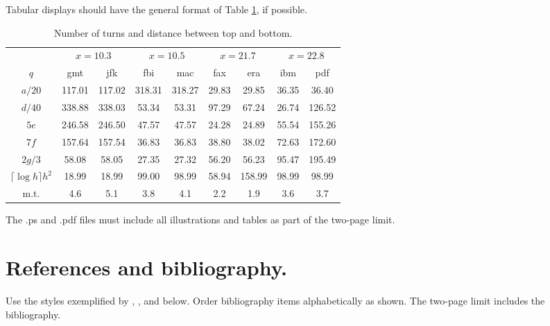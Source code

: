 \documentclass[twoside]{article}
\begin{document}
Tabular displays should have the general format of Table \ref{turns}, if
possible.  

\begin{table}[h]
\begin{center} {\footnotesize
\begin{tabular}{|c|cc|cc|cc|cc|}
\hline
 & \multicolumn{2}{c|}{$x=10.3$} & \multicolumn{2}{c|}{$x=10.5$} &
\multicolumn{2}{c|}{$x=21.7$} & \multicolumn{2}{c|}{$x=22.8$} \\
$q$  & \multicolumn{1}{c}{gmt} & \multicolumn{1}{c|}{jfk} &
\multicolumn{1}{c}{fbi} & \multicolumn{1}{c|}{mac} & \multicolumn{1}{c}{fax} &
\multicolumn{1}{c|}{era} & \multicolumn{1}{c}{ibm} &
\multicolumn{1}{c|}{pdf}\\\hline
$a/20$ &     117.01 & 117.02  &   318.31 & 318.27  &   29.83 & 29.85    & 36.35 
& 36.40 \\
$d/40$  &     338.88 & 338.03  &   53.34 & 53.31  &  97.29 & 67.24 &   26.74 &
126.52 \\
$5e$ &     246.58 & 246.50  &   47.57 & 47.57  &  24.28 & 24.89 &   55.54 &
155.26 \\
$7f$    &     157.64 & 157.54  &   36.83 & 36.83  &  38.80 & 38.02 &   72.63 &
172.60 \\
$2g/3$   &     58.08 & 58.05  &   27.35 & 27.32  &  56.20 & 56.23 &   95.47 &
195.49 \\
$\lceil \log h \rceil h^2$    &     18.99 & 18.99  &   99.00 & 98.99  &  58.94 &
158.99 &   98.99 & 98.99 \\
\hline m.t. &     4.6 &  5.1 &     3.8 &  4.1 &     2.2 & 1.9  &   3.6 &  3.7 \\
\hline
\end{tabular} }
\end{center}
\caption{\footnotesize Number of turns and distance between top and bottom.}
\label{turns}
\end{table}

The .ps and .pdf files must include all illustrations and tables as part of the
two-page limit.

\section{\large References and bibliography.}

Use the styles exemplified by \cite{HB98}, \cite{CA}, \cite{MSW00} and
\cite{Rei91} below.  Order bibliography items alphabetically as shown.  The
two-page limit includes the bibliography.
 
\end{document}
